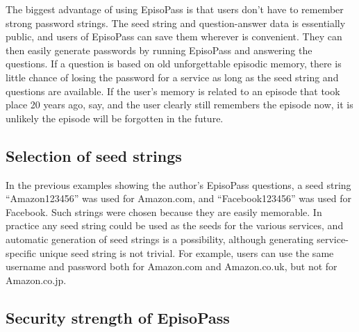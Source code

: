 \documentclass[runningheads,a4paper]{llncs}
\begin{document}

The biggest advantage of using EpisoPass is that
users don't have to remember strong password strings.
%
The seed string and question-answer data is essentially public,
and users of EpisoPass can save them wherever is convenient. They can
then easily generate passwords by running
EpisoPass and answering the questions.
If a question is based on old unforgettable episodic memory,
there is little chance of losing the password for a service
as long as the seed string and questions are available.
If the user's memory is related to an episode that took place 20 years ago, say, and the user clearly
still remembers the episode now, it is unlikely the episode will be forgotten in the future.

\subsection{Selection of seed strings}


In the previous examples showing the author's EpisoPass questions, a
seed string ``\textsf{Amazon123456}'' was used for Amazon.com, and
``\textsf{Facebook123456}'' was used for Facebook.  Such strings were
chosen because they are easily memorable.  In practice any seed string
could be used as the seeds for the various services, and automatic
generation of seed strings is a possibility, although generating
service-specific unique seed string is not trivial.  For example,
users can use the same username and password both for Amazon.com and
Amazon.co.uk, but not for Amazon.co.jp.

\subsection{Security strength of EpisoPass}
\end{document}
